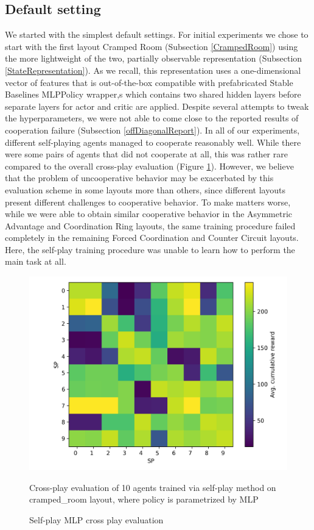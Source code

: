 \subsection*{Default setting}
We started with the simplest default settings.
For initial experiments we chose to start with the first layout Cramped Room (Subsection \ref{CrampedRoom}) using the more lightweight of the two, partially observable representation (Subsection \ref{StateRepresentation}).
As we recall, this representation uses a one-dimensional vector of features that is out-of-the-box compatible with prefabricated Stable Baselines MLPPolicy wrapper,s which contains two shared hidden layers before separate layers for actor and critic are applied.
Despite several attempts to tweak the hyperparameters, we were not able to come close to the reported results of cooperation failure (Subsection \ref{offDiagonalReport}).
In all of our experiments, different self-playing agents managed to cooperate reasonably well.
While there were some pairs of agents that did not cooperate at all, this was rather rare compared to the overall cross-play evaluation (Figure \ref{MLPSPCrossPlay}).
However, we believe that the problem of uncooperative behavior may be exacerbated by this evaluation scheme in some layouts more than others, since different layouts present different challenges to cooperative behavior.
To make matters worse, while we were able to obtain similar cooperative behavior in the Asymmetric Advantage and Coordination Ring layouts, the same training procedure failed completely in the remaining Forced Coordination and Counter Circuit layouts.
Here, the self-play training procedure was unable to learn how to perform the main task at all.

\begin{figure}[!ht]
    \centering
    \includegraphics*[width=13cm]{../img/MLP_OFF_DIAG_TEST(3).png}
    \caption{Self-play MLP cross play evaluation}
    \label{MLPSPCrossPlay}
    \medskip
    \small 
    Cross-play evaluation of 10 agents trained via self-play method on cramped\_room layout, where policy is parametrized by MLP

\end{figure}

